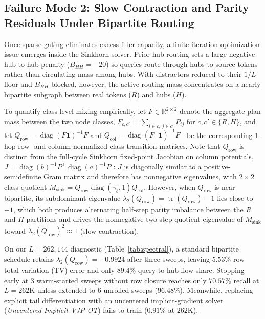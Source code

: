\documentclass[11pt]{article}
\newcommand{\one}{\mathbf{1}}
\begin{document}
\subsection{Failure Mode 2: Slow Contraction and Parity Residuals Under Bipartite Routing}
\label{sec:oscillation}

Once sparse gating eliminates excess filler capacity, a finite-iteration optimization issue emerges inside the Sinkhorn solver. Prior hub routing \citep{forde2026blockwise} sets a large negative hub-to-hub penalty ($B_{HH} = -20$) so queries route through hubs to source tokens rather than circulating mass among hubs. With distractors reduced to their $1/L$ floor and $B_{HH}$ blocked, however, the active routing mass concentrates on a nearly bipartite subgraph between real tokens ($R$) and hubs ($H$).

To quantify class-level mixing empirically, let $F \in \mathbb{R}^{2\times 2}$ denote the aggregate plan mass between the two node classes, $F_{c,c'} = \sum_{i \in c,\, j \in c'} P_{ij}$ for $c, c' \in \{R, H\}$, and let $Q_{\text{row}} = \operatorname{diag}(F\one)^{-1} F$ and $Q_{\text{col}} = \operatorname{diag}(F^\top\one)^{-1} F^\top$ be the corresponding 1-hop row- and column-normalized class transition matrices. Note that $Q_{\text{row}}$ is distinct from the full-cycle Sinkhorn fixed-point Jacobian on column potentials, $J = \operatorname{diag}(b)^{-1} P^\top \operatorname{diag}(a)^{-1} P$ \citep{knight2008sinkhorn}: $J$ is diagonally similar to a positive-semidefinite Gram matrix and therefore has nonnegative eigenvalues, with $2\times 2$ class quotient $M_{\text{sink}} = Q_{\text{row}} \operatorname{diag}(\gamma_b, 1) Q_{\text{col}}$. However, when $Q_{\text{row}}$ is near-bipartite, its subdominant eigenvalue $\lambda_2(Q_{\text{row}}) = \operatorname{tr}(Q_{\text{row}}) - 1$ lies close to $-1$, which both produces alternating half-step parity imbalance between the $R$ and $H$ partitions and drives the nonnegative two-step quotient eigenvalue of $M_{\text{sink}}$ toward $\lambda_2(Q_{\text{row}})^2 \approx 1$ (slow contraction).

On our $L=262{,}144$ diagnostic (Table~\ref{tab:spectral}), a standard bipartite schedule retains $\lambda_2(Q_{\text{row}}) = -0.9924$ after three sweeps, leaving $5.53\%$ row total-variation (TV) error and only $89.4\%$ query-to-hub flow share. Stopping early at $3$ warm-started sweeps without row closure reaches only $70.57\%$ recall at $L=262\text{K}$ unless extended to $6$ unrolled sweeps ($96.48\%$). Meanwhile, replacing explicit tail differentiation with an uncentered implicit-gradient solver (\emph{Uncentered Implicit-VJP OT}) fails to train ($0.91\%$ at $262\text{K}$).
\end{document}
